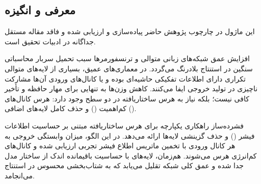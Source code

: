 \subsection{معرفی و انگیزه}
این ماژول در چارچوب پژوهش حاضر پیاده‌سازی و ارزیابی شده و فاقد مقاله مستقل جداگانه در ادبیات تحقیق است.

افزایش عمق شبکه‌های زبانی متوالی و ترنسفورمرها سبب تحمیل سربار محاسباتی سنگین در استنتاج بلادرنگ می‌گردد. در معماری‌های عمیق، بسیاری از لایه‌های متوالی تکراری دارای اطلاعات تفکیکی حاشیه‌ای بوده و یا کانال‌های ورودی آن‌ها مشارکت ناچیزی در تولید خروجی ایفا می‌کنند. کاهش وزن‌ها به تنهایی برای مهار حافظه و تأخیر کافی نیست؛ بلکه نیاز به هرس ساختاریافته در دو سطح وجود دارد: هرس کانال‌های کم‌اهمیت () و حذف کامل لایه‌های اضافی ().

فشرده‌ساز  راهکاری یکپارچه برای هرس ساختاریافته مبتنی بر حساسیت اطلاعات فیشر () و حذف گزینشی لایه‌ها ارائه می‌دهد. در این الگو، میزان وابستگی خروجی به هر کانال ورودی با تخمین ماتریس اطلاع فیشر تجربی ارزیابی شده و کانال‌های کم‌انرژی هرس می‌شوند. هم‌زمان، لایه‌های با حساسیت باقیمانده اندک از ساختار مدل جدا شده و عمق کلی شبکه تقلیل می‌یابد که به شتاب‌بخشی محسوس در استنتاج می‌انجامد.
